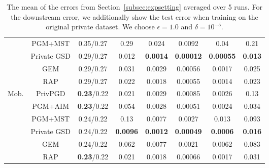 \begin{table}[ht]
\begin{tabular}{cccccccc}
 & PGM+MST&0.35/0.27 & 0.29 & 0.024 & 0.0092 & 0.04 & 0.21 \\
 & Private GSD&0.29/0.27 & 0.012 & \textbf{0.0014} & \textbf{0.00012} & \textbf{0.00055} & \textbf{0.013} \\
 & GEM&0.29/0.27 & 0.031 & 0.0029 & 0.00056 & 0.0017 & 0.025 \\
 & RAP&0.29/0.27 & 0.022 & 0.0018 & 0.00055 & 0.0014 & 0.023 \\
\midrule \multirow{6}{*}{Mob. } & PrivPGD&\textbf{0.23}/0.22 & 0.021 & 0.0029 & 0.00085 & 0.0026 & 0.13 \\
 & PGM+AIM&\textbf{0.23}/0.22 & 0.054 & 0.0028 & 0.00051 & 0.0024 & 0.034 \\
 & PGM+MST&0.24/0.22 & 0.13 & 0.0077 & 0.0027 & 0.013 & 0.093 \\
 & Private GSD&0.24/0.22 & \textbf{0.0096} & \textbf{0.0012} & \textbf{0.00049} & \textbf{0.0006} & \textbf{0.016} \\
 & GEM&0.24/0.22 & 0.062 & 0.0077 & 0.0021 & 0.0062 & 0.083 \\
 & RAP&\textbf{0.23}/0.22 & 0.021 & 0.0018 & 0.00066 & 0.0017 & 0.031 \\

 \bottomrule
\end{tabular}
\caption{
    \small The mean of the errors from Section~\ref{subsec:expsetting}  averaged over 5 runs. For the downstream error, we additionally show the test error when training on the original private dataset. We choose $\epsilon =1.0$ and $\delta = 10^{-5}$.}
\end{table}


